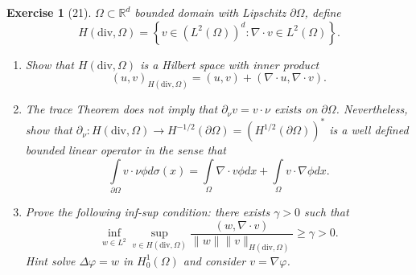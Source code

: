\documentclass[letterpaper,twoside,11pt]{article}
\theoremstyle{mystyle}
\newtheorem*{exercise}{Exercise}
\newcommand{\R}{{\mathbb R}}
\begin{document}
\newpage 
\begin{exercise}[21]
  $\Omega \subset \R^d$ bounded domain with Lipschitz $\partial \Omega$, define 
  \[H\left( \text{div}, \Omega \right) = \left\{ v\in (L^2(\Omega))^d : \nabla \cdot v \in L^2 (\Omega )\right\}.\]
\begin{enumerate}
  \item Show that $H\left( \text{div}, \Omega \right)$ is a Hilbert space with inner product 
  \[\left( u,v \right)_{H(\text{div}, \Omega)} = \left( u,v \right) + \left( \nabla \cdot u, \nabla \cdot v \right).\]
  \item The trace Theorem does not imply that $\partial_\nu v = v \cdot \nu$ exists on $\partial \Omega$. Nevertheless, show that $\partial_\nu : H\left( \text{div}, \Omega \right) \to H^{-1/2} \left( \partial \Omega \right) = \left( H^{1/2}(\partial \Omega) \right)^*$ is a well defined bounded linear operator in the sense that 
  \[\int\limits_{\partial \Omega} v \cdot \nu \phi d\sigma(x) = \int\limits_{\Omega} \nabla \cdot v \phi dx + \int\limits_{\Omega} v\cdot \nabla \phi dx.\]
  \item Prove the following inf-sup condition: there exists $\gamma > 0$ such that 
  \[\inf_{w\in L^2} \sup_{v\in H(\text{div},\Omega)} \frac{(w, \nabla \cdot v)}{\|w\| \|v\|_{H(\text{div}, \Omega)}}\geq \gamma > 0.\]
  Hint solve $\Delta \varphi = w$ in $H_0^1 \left( \Omega \right)$ and consider $v  = \nabla \varphi$. 

\end{enumerate}
\end{exercise}
\end{document}
